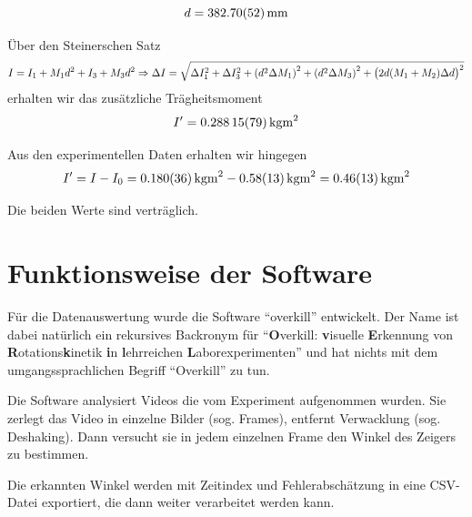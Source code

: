 \documentclass[a4paper,german,12pt,smallheadings]{scrartcl}
\begin{document}
\begin{equation}
  d = \SI{382.70\pm0.52}{mm}
\end{equation}

Über den Steinerschen Satz
\begin{equation}
  I = I_1 + M_1 d^2 + I_3 + M_3 d^2 \Rightarrow
  \Delta I = \sqrt{\Delta I_1^2 + \Delta I_3^2 + \del{d^2 \Delta M_1}^2 +
  \del{d^2 \Delta M_3}^2 + \del{2d (M_1+M_2) \Delta d}^2}
\end{equation}
erhalten wir das zusätzliche Trägheitsmoment
\begin{equation}
  I' = \SI{0.28815+-0.00079}{kg m^2}
\end{equation}

Aus den experimentellen Daten erhalten wir hingegen
\begin{equation}
  I' = I - I_0 = \SI{0.180+-0.036}{kg m^2} - \SI{0.58+-0.13}{kg m^2} = \SI{0.46+-0.13}{kg m^2}
\end{equation}

Die beiden Werte sind verträglich.

\section{Funktionsweise der Software}
\label{chap:software}
Für die Datenauswertung wurde die Software ``overkill'' entwickelt. Der Name
ist dabei natürlich ein rekursives Backronym für ``\textbf{O}verkill:
\textbf{v}isuelle \textbf{E}rkennung von \textbf{R}otations\textbf{k}inetik
\textbf{i}n \textbf{l}ehrreichen \textbf{L}aborexperimenten'' und hat nichts mit dem
umgangssprachlichen Begriff ``Overkill'' zu tun.

Die Software analysiert Videos die vom Experiment aufgenommen wurden. Sie
zerlegt das Video in einzelne Bilder (sog. Frames), entfernt Verwacklung (sog.
Deshaking). Dann versucht sie in jedem einzelnen Frame den Winkel des Zeigers
zu bestimmen.

Die erkannten Winkel werden mit Zeitindex und Fehlerabschätzung in eine
CSV-Datei exportiert, die dann weiter verarbeitet werden kann.
\end{document}
